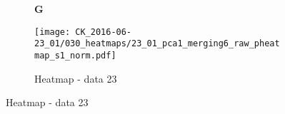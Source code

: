\documentclass[a4paper, 12pt]{article}
\begin{document}
\begin{figure}[!thb]
\centering

        \caption{}
    \begin{subfigure}[t]{0.02\textwidth}
    \vskip 0pt
        \textbf{\textsf{\normalsize G}}
    \end{subfigure}
    \begin{subfigure}[t]{0.97\textwidth}
    \vskip 0pt
    \caption{Heatmap - data 23}
        \texttt{[image: CK\_2016-06-23\_01/030\_heatmaps/23\_01\_pca1\_merging6\_raw\_pheatmap\_s1\_norm.pdf]}
    \end{subfigure}
    
\end{figure}
\end{document}
